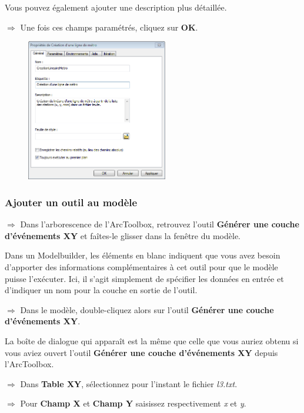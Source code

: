 \documentclass[11pt]{article}
\newcommand{\action}{$\Rightarrow$ }
\begin{document}
Vous pouvez également ajouter une description plus détaillée.

\action Une fois ces champs paramétrés, cliquez sur \textbf{OK}.
\begin{figure}[H]
	\center \includegraphics[width=0.55\textwidth]{img/td3/modelbuilder_creation.png}\\
\end{figure}


\subsubsection{Ajouter un outil au modèle}
\action Dans l'arborescence de l'ArcToolbox, retrouvez l'outil \textbf{Générer une couche d'événements XY} et faîtes-le glisser dans la fenêtre du modèle.

Dans un Modelbuilder, les éléments en blanc indiquent que vous avez besoin d'apporter des informations complémentaires à cet outil pour que le modèle puisse l'exécuter. Ici, il s'agit simplement de spécifier les données en entrée et d'indiquer un nom pour la couche en sortie de l'outil.

\action Dans le modèle, double-cliquez alors sur l'outil \textbf{Générer une couche d'événements XY}.

La boîte de dialogue qui apparaît est la même que celle que vous auriez obtenu si vous aviez ouvert l'outil \textbf{Générer une couche d'événements XY} depuis l'ArcToolbox.

\action Dans \textbf{Table XY}, sélectionnez pour l'instant le fichier \textit{l3.txt}.

\action Pour \textbf{Champ X} et \textbf{Champ Y} saisissez respectivement \textit{x} et \textit{y}.
\end{document}
